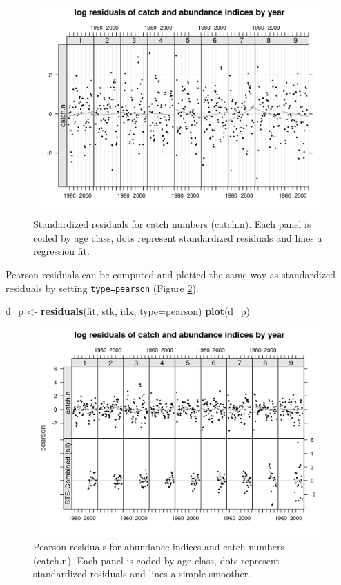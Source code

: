 \documentclass[
]{book}
\newenvironment{Shaded}{\begin{snugshade}}{\end{snugshade}}
\newcommand{\AttributeTok}[1]{\textcolor[rgb]{0.13,0.29,0.53}{#1}}
\newcommand{\FunctionTok}[1]{\textcolor[rgb]{0.13,0.29,0.53}{\textbf{#1}}}
\newcommand{\NormalTok}[1]{#1}
\newcommand{\OtherTok}[1]{\textcolor[rgb]{0.56,0.35,0.01}{#1}}
\newcommand{\StringTok}[1]{\textcolor[rgb]{0.31,0.60,0.02}{#1}}
\begin{document}
\begin{figure}
\centering
\includegraphics{_bookdown_files/_main_files/figure-html/resaux-1.png}
\caption{\label{fig:resaux}Standardized residuals for catch numbers (catch.n). Each panel is coded by age class, dots represent standardized residuals and lines a regression fit.}
\end{figure}

Pearson residuals can be computed and plotted the same way as standardized residuals by setting \texttt{type=\textquotesingle{}pearson\textquotesingle{}} (Figure \ref{fig:resp}).

\begin{Shaded}
\begin{Highlighting}[]
\NormalTok{d\_p }\OtherTok{\textless{}{-}} \FunctionTok{residuals}\NormalTok{(fit, stk, idx, }\AttributeTok{type=}\StringTok{\textquotesingle{}pearson\textquotesingle{}}\NormalTok{)}
\FunctionTok{plot}\NormalTok{(d\_p)}
\end{Highlighting}
\end{Shaded}

\begin{figure}
\centering
\includegraphics{_bookdown_files/_main_files/figure-html/resp-1.png}
\caption{\label{fig:resp}Pearson residuals for abundance indices and catch numbers (catch.n). Each panel is coded by age class, dots represent standardized residuals and lines a simple smoother.}
\end{figure}
\end{document}
